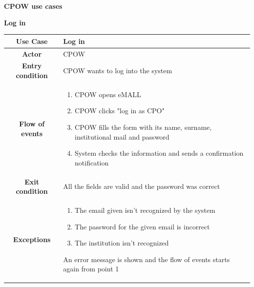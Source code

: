 \documentclass[table, 12pt]{article} %
\begin{document}
\begin{itemize}
            \item \textbf {CPOW use cases}
            \begin{table}[H]
                \item[] \textbf{Log in}
                \item[]
                \centering
                \begin{tabular}{|c |m{}|}
                    \hline
                    \textbf{Use Case} & Log in\\ \hline
                    \textbf{Actor} & CPOW\\ \hline
                    \textbf{Entry condition} & CPOW wants to log into the system \\  \hline
                    \textbf{Flow of events} & \begin{enumerate}
                                                \item CPOW opens eMALL
                                                \item CPOW clicks "log in as CPO"
                                                \item CPOW fills the form with its name, surname, institutional mail and password
                                                \item System checks the information and sends a confirmation notification
                                            \end{enumerate}\\ \hline
                    \textbf{Exit condition} &  All the fields are valid and the password was correct\\ \hline
                    \textbf{Exceptions} &  \begin{enumerate}
                        \item The email given isn't recognized by the system
                        \item The password for the given email is incorrect
                        \item The institution isn't recognized
                    \end{enumerate}
                    An error message is shown and the flow of events starts again from point 1\\ \hline
                \end{tabular}
            \end{table}


\end{itemize}
\end{document}

